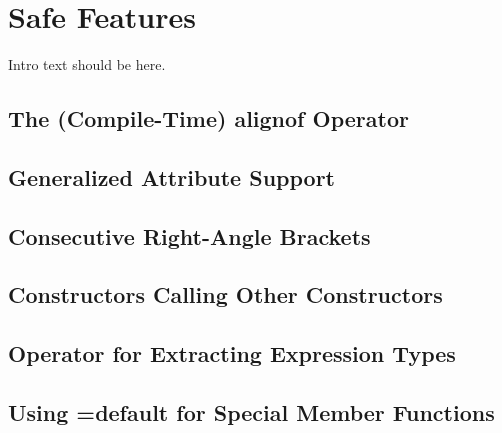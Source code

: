 
\chapter[Safe Features]{Safe Features}\label{ch-safe}

Intro text should be here. 

\renewcommand{\cppxx}{C++11}

\newpage
{}
\section[{\tt alignof}]{The (Compile-Time) {\SecCode alignof} Operator}\label{alignof}


\newpage
\section[Attribute Syntax]{Generalized Attribute Support}\label{attributes}


\newpage
\section[Consecutive {\tt >}s]{Consecutive Right-Angle Brackets}\label{consecutive-right-angle-brackets}


\newpage
\section[Delegating Ctors]{Constructors Calling Other Constructors}\label{delegating-constructors}


\newpage
\section[\tt{decltype}]{Operator for Extracting Expression Types}\label{decltype}


\newpage
\section[Defaulted Functions]{Using {\SecCode =default} for Special Member Functions}\label{Defaulted-Special-Member-Functions}\label{defaulted-special-member-functions}


